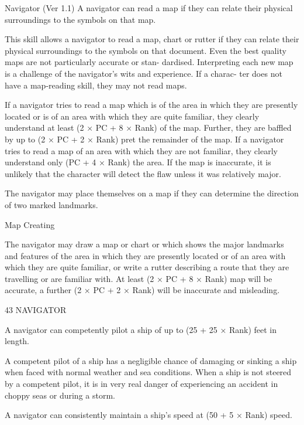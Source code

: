 \begin{Chapter}{Navigator (Ver 1.1)}
A  navigator  can  read  a  map  if  they  can  relate 
their  physical  surroundings  to  the  symbols  on 
that map. 

This skill allows a navigator to read a map, chart or 
rutter if they can relate their physical surroundings 
to  the  symbols  on  that  document.  Even  the  best 
quality  maps  are  not  particularly  accurate  or  stan-
dardised. Interpreting each new map is a challenge 
of the navigator’s wits and experience. If a charac-
ter does not have a map-reading skill, they may not 
read maps. 

If  a  navigator  tries  to  read  a  map  which  is  of  the 
area in which they are presently located or is of an 
area  with  which  they  are  quite  familiar,  they 
clearly  understand  at  least  (2  ×  PC  +  8  ×  Rank)%
of the map. Further, they are baffled by up to (2 × 
PC + 2 × Rank)%
pret  the  remainder  of  the  map.  If  a  navigator  tries 
to  read  a  map  of  an  area  with  which  they  are  not 
familiar,  they  clearly  understand  only  (PC  +  4  × 
Rank)%
the area. If the map is inaccurate, it is unlikely that 
the  character  will  detect  the  flaw  unless  it  was 
relatively major. 

The  navigator  may  place  themselves  on  a  map  if 
they  can  determine  the  direction  of  two  marked 
landmarks. 

Map Creating 

The  navigator  may  draw  a  map  or  chart  or  which 
shows the major landmarks and features of the area 
in  which  they  are  presently  located  or  of  an  area 
with which they are quite familiar, or write a rutter 
describing  a  route  that  they  are  travelling  or  are 
familiar with. At least (2 × PC + 8 × Rank)%
map  will  be  accurate,  a  further  (2  ×  PC  +  2  × 
Rank)%
will be inaccurate and misleading. 

43 NAVIGATOR 

A  navigator  can  competently  pilot  a  ship  of  up 
to (25 + 25 × Rank) feet in length. 

A competent pilot of a ship has a negligible chance 
of  damaging  or  sinking  a  ship  when  faced  with 
normal weather and sea conditions. When a ship is 
not  steered  by  a  competent  pilot,  it  is  in  very  real 
danger of experiencing an accident in choppy seas 
or during a storm. 

A  navigator  can  consistently  maintain  a  ship’s 
speed  at  (50  +  5  ×  Rank)%
speed. 


\end{Chapter}

